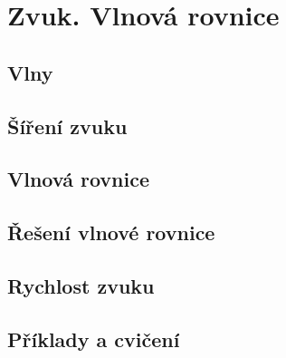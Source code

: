 \chapter{Zvuk. Vlnová rovnice}\label{fyz:IchapXLVII}
\minitoc
  \section{Vlny}\label{fyz:IchapXLVIIsecI}
  \section{Šíření zvuku}\label{fyz:IchapXLVIIsecII}
  \section{Vlnová rovnice}\label{fyz:IchapXLVIIsecIII}
  \section{Řešení vlnové rovnice}\label{fyz:IchapXLVIIsecIV}
  \section{Rychlost zvuku}\label{fyz:IchapXLVIIsecV}
  \section{Příklady a cvičení}\label{fyz:IchapXLVIIsecVI}